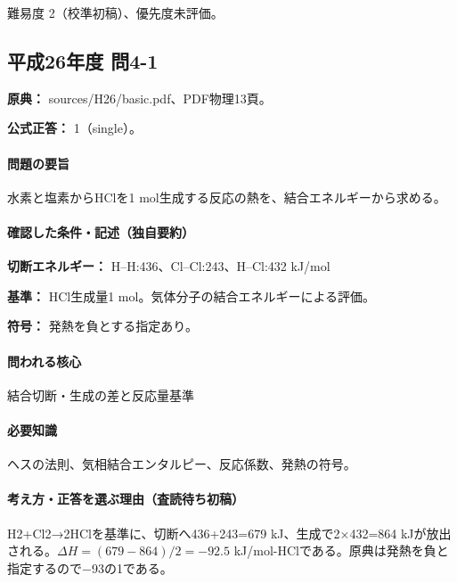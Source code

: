 \par 難易度 2（校準初稿）、優先度未評価。

\subsection{平成26年度 問4-1}
\label{q:h26-reg-basic-4-1}

\noindent\textbf{原典：} sources/H26/basic.pdf、PDF物理13頁。

\textbf{公式正答：} 1（single）。

\paragraph{問題の要旨} 水素と塩素からHClを1 mol生成する反応の熱を、結合エネルギーから求める。

\paragraph{確認した条件・記述（独自要約）}\mbox{}\par

\noindent\textbf{切断エネルギー：} H–H:436、Cl–Cl:243、H–Cl:432 kJ/mol\par

\noindent\textbf{基準：} HCl生成量1 mol。気体分子の結合エネルギーによる評価。\par

\noindent\textbf{符号：} 発熱を負とする指定あり。\par

\paragraph{問われる核心} 結合切断・生成の差と反応量基準

\paragraph{必要知識} ヘスの法則、気相結合エンタルピー、反応係数、発熱の符号。

\paragraph{考え方・正答を選ぶ理由（査読待ち初稿）} H2+Cl2→2HClを基準に、切断へ436+243=\allowbreak{}679 kJ、生成で2×432=\allowbreak{}864 kJが放出される。\(\Delta H=(679-864)/2=-92.5\) kJ/mol-HClである。原典は発熱を負と指定するので−93の1である。

